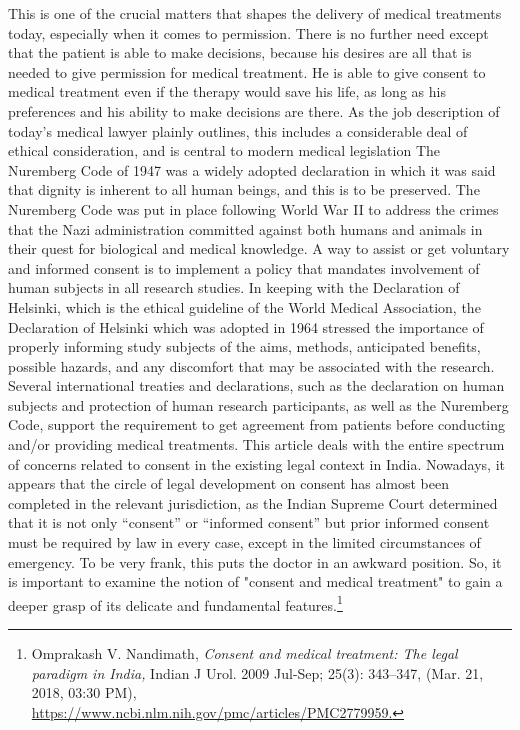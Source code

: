 \begin{multicols}{2}
\noi
This is one of the crucial matters that shapes the delivery of medical treatments today,
especially when it comes to permission. There is no further need except that the patient is
able to make decisions, because his desires are all that is needed to give permission for
medical treatment. He is able to give consent to medical treatment even if the therapy would
save his life, as long as his preferences and his ability to make decisions are there. As the job
description of today's medical lawyer plainly outlines, this includes a considerable deal of
ethical consideration, and is central to modern medical legislation The Nuremberg Code of
1947 was a widely adopted declaration in which it was said that dignity is inherent to all
human beings, and this is to be preserved. The Nuremberg Code was put in place following
World War II to address the crimes that the Nazi administration committed against both
humans and animals in their quest for biological and medical knowledge. A way to assist or
get voluntary and informed consent is to implement a policy that mandates involvement of
human subjects in all research studies. In keeping with the Declaration of Helsinki, which is
the ethical guideline of the World Medical Association, the Declaration of Helsinki which
was adopted in 1964 stressed the importance of properly informing study subjects of the 
aims, methods, anticipated benefits, possible hazards, and any discomfort that may be
associated with the research. Several international treaties and declarations, such as the
declaration on human subjects and protection of human research participants, as well as the
Nuremberg Code, support the requirement to get agreement from patients before conducting
and/or providing medical treatments. This article deals with the entire spectrum of concerns
related to consent in the existing legal context in India. Nowadays, it appears that the circle of
legal development on consent has almost been completed in the relevant jurisdiction, as the
Indian Supreme Court determined that it is not only “consent” or “informed consent” but
prior informed consent must be required by law in every case, except in the limited
circumstances of emergency. To be very frank, this puts the doctor in an awkward position.
So, it is important to examine the notion of "consent and medical treatment" to gain a deeper
grasp of its delicate and fundamental features.\footnote{Omprakash V. Nandimath, \textit{Consent and medical treatment: The legal paradigm in India,} Indian J Urol. 2009 Jul-Sep; 25(3): 343–347, (Mar. 21, 2018, 03:30 PM), \url{https://www.ncbi.nlm.nih.gov/pmc/articles/PMC2779959.}}


\end{multicols}
